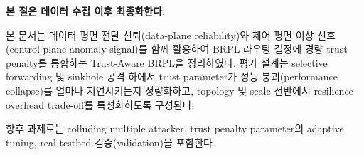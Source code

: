 \documentclass[11pt,a4paper]{article}
\begin{document}
\noindent\textbf{본 절은 데이터 수집 이후 최종화한다.}

본 문서는 데이터 평면 전달 신뢰(data-plane reliability)와 제어 평면 이상 신호(control-plane anomaly signal)를 함께 활용하여 BRPL 라우팅 결정에 경량 trust penalty를 통합하는 Trust-Aware BRPL을 정리하였다. 평가 설계는 selective forwarding 및 sinkhole 공격 하에서 trust parameter가 성능 붕괴(performance collapse)를 얼마나 지연시키는지 정량화하고, topology 및 scale 전반에서 resilience--overhead trade-off를 특성화하도록 구성된다.

향후 과제로는 colluding multiple attacker, trust penalty parameter의 adaptive tuning, real testbed 검증(validation)을 포함한다.



\end{document}
